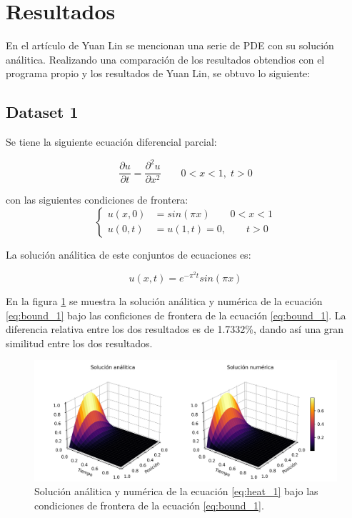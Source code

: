 \section{Resultados}

En el artículo de Yuan Lin\cite{yuan_2009} se mencionan una serie de PDE con su solución análitica. Realizando una comparación de los resultados obtendios con el programa propio y los resultados de Yuan Lin, se obtuvo lo siguiente:

\subsection{Dataset 1}

Se tiene la siguiente ecuación diferencial parcial:

\begin{equation}
    \frac{\partial u}{\partial t} = \frac{\partial^2 u}{\partial x^2} \qquad 0<x<1, \; t>0 \label{eq:heat_1}
\end{equation}

con las siguientes condiciones de frontera:
\begin{equation}
    \begin{cases}
        u(x,0) & = sin(\pi x) \qquad 0<x<1 \\
        u(0,t) & =u(1,t) = 0, \qquad t>0
    \end{cases} \label{eq:bound_1}
\end{equation}

La solución análitica de este conjuntos de ecuaciones es:

\begin{equation}
    u(x,t)= e^{-\pi^2 t}sin(\pi x) \label{eq:sol_1}
\end{equation}

En la figura \ref{fig:sol_1} se muestra la solución análitica y numérica de la ecuación \ref{eq:bound_1} bajo las conficiones de frontera de la ecuación \ref{eq:bound_1}. La diferencia relativa entre los dos resultados es de 1.7332\%, dando así una gran similitud entre los dos resultados.

\begin{figure}[H]
    \centering
    \includegraphics[width=17cm]{Graphics/surface_1.png}
    \caption{Solución análitica y numérica de la ecuación \ref{eq:heat_1} bajo las condiciones de frontera de la ecuación \ref{eq:bound_1}.}
    \label{fig:sol_1}
\end{figure}

